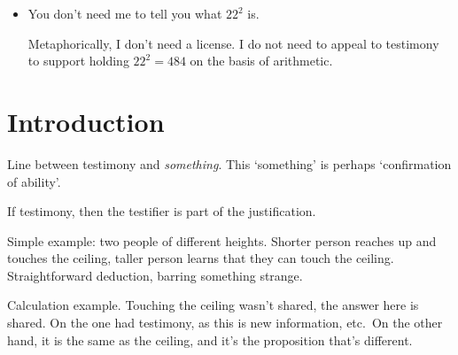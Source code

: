 \documentclass[10pt]{article}
\begin{document}
\begin{itemize}
{    Agent needs to appeal to their ability to do (simple) arithmetic, but this is different from appealing to a different source of information.
  }\nolinebreak
  \footnote{
    `Licensed' in the sense that one has been granted the relation by an authority, in a sense.
  }

  No trouble in understanding the conditions of use as outsourced (testimony).
  However, let us turn to the second part of the assertion.

  \begin{itemize}
  \item You don't need to tell me that \(22^{2} = 484\) follows from arithmetic.
  \end{itemize}


  This is not the only reason that you don't need me to tell you that \(22^{2}\) is \(484\).
  Someone else may tell you, you may have access to a calculator, perhaps you purchased twenty-two items priced twenty-two dollars and inferred the equality after looking at the total on your receipt, and so on.

  However, salient disambiguation is that I have the ability to calculate the result of \(22^{2}\).

\item You don't need me to tell you what \(22^{2}\) is.

  Metaphorically, I don't need a license.
  I do not need to appeal to testimony to support holding \(22^{2} = 484\) on the basis of arithmetic.
\end{itemize}

\newpage


\section{Introduction}
\label{sec:introduction}

Line between testimony and \emph{something}.
This `something' is perhaps `confirmation of ability'.

If testimony, then the testifier is part of the justification.

Simple example: two people of different heights.
Shorter person reaches up and touches the ceiling, taller person learns that they can touch the ceiling.
Straightforward deduction, barring something strange.

Calculation example.
Touching the ceiling wasn't shared, the answer here is shared.
On the one had testimony, as this is new information, etc.\
On the other hand, it is the same as the ceiling, and it's the proposition that's different.
\end{document}

